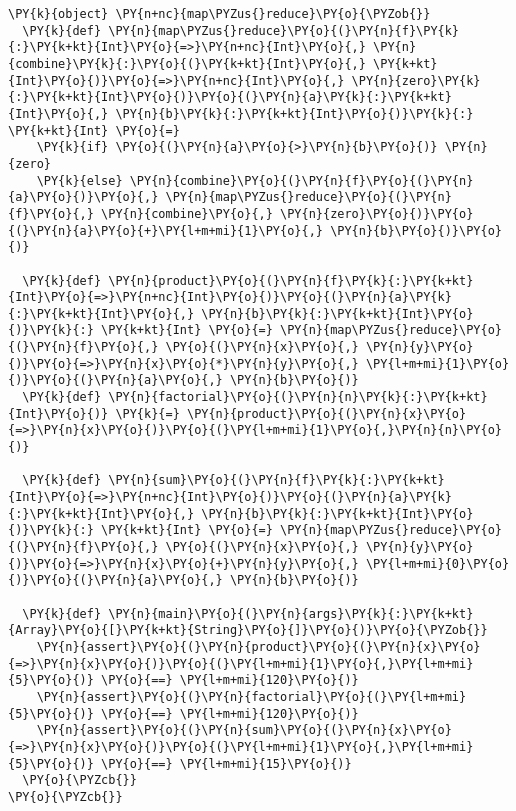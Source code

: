\begin{Verbatim}[commandchars=\\\{\}]
\PY{k}{object} \PY{n+nc}{map\PYZus{}reduce}\PY{o}{\PYZob{}}
  \PY{k}{def} \PY{n}{map\PYZus{}reduce}\PY{o}{(}\PY{n}{f}\PY{k}{:}\PY{k+kt}{Int}\PY{o}{=>}\PY{n+nc}{Int}\PY{o}{,} \PY{n}{combine}\PY{k}{:}\PY{o}{(}\PY{k+kt}{Int}\PY{o}{,} \PY{k+kt}{Int}\PY{o}{)}\PY{o}{=>}\PY{n+nc}{Int}\PY{o}{,} \PY{n}{zero}\PY{k}{:}\PY{k+kt}{Int}\PY{o}{)}\PY{o}{(}\PY{n}{a}\PY{k}{:}\PY{k+kt}{Int}\PY{o}{,} \PY{n}{b}\PY{k}{:}\PY{k+kt}{Int}\PY{o}{)}\PY{k}{:} \PY{k+kt}{Int} \PY{o}{=}
    \PY{k}{if} \PY{o}{(}\PY{n}{a}\PY{o}{>}\PY{n}{b}\PY{o}{)} \PY{n}{zero}
    \PY{k}{else} \PY{n}{combine}\PY{o}{(}\PY{n}{f}\PY{o}{(}\PY{n}{a}\PY{o}{)}\PY{o}{,} \PY{n}{map\PYZus{}reduce}\PY{o}{(}\PY{n}{f}\PY{o}{,} \PY{n}{combine}\PY{o}{,} \PY{n}{zero}\PY{o}{)}\PY{o}{(}\PY{n}{a}\PY{o}{+}\PY{l+m+mi}{1}\PY{o}{,} \PY{n}{b}\PY{o}{)}\PY{o}{)}

  \PY{k}{def} \PY{n}{product}\PY{o}{(}\PY{n}{f}\PY{k}{:}\PY{k+kt}{Int}\PY{o}{=>}\PY{n+nc}{Int}\PY{o}{)}\PY{o}{(}\PY{n}{a}\PY{k}{:}\PY{k+kt}{Int}\PY{o}{,} \PY{n}{b}\PY{k}{:}\PY{k+kt}{Int}\PY{o}{)}\PY{k}{:} \PY{k+kt}{Int} \PY{o}{=} \PY{n}{map\PYZus{}reduce}\PY{o}{(}\PY{n}{f}\PY{o}{,} \PY{o}{(}\PY{n}{x}\PY{o}{,} \PY{n}{y}\PY{o}{)}\PY{o}{=>}\PY{n}{x}\PY{o}{*}\PY{n}{y}\PY{o}{,} \PY{l+m+mi}{1}\PY{o}{)}\PY{o}{(}\PY{n}{a}\PY{o}{,} \PY{n}{b}\PY{o}{)}
  \PY{k}{def} \PY{n}{factorial}\PY{o}{(}\PY{n}{n}\PY{k}{:}\PY{k+kt}{Int}\PY{o}{)} \PY{k}{=} \PY{n}{product}\PY{o}{(}\PY{n}{x}\PY{o}{=>}\PY{n}{x}\PY{o}{)}\PY{o}{(}\PY{l+m+mi}{1}\PY{o}{,}\PY{n}{n}\PY{o}{)}

  \PY{k}{def} \PY{n}{sum}\PY{o}{(}\PY{n}{f}\PY{k}{:}\PY{k+kt}{Int}\PY{o}{=>}\PY{n+nc}{Int}\PY{o}{)}\PY{o}{(}\PY{n}{a}\PY{k}{:}\PY{k+kt}{Int}\PY{o}{,} \PY{n}{b}\PY{k}{:}\PY{k+kt}{Int}\PY{o}{)}\PY{k}{:} \PY{k+kt}{Int} \PY{o}{=} \PY{n}{map\PYZus{}reduce}\PY{o}{(}\PY{n}{f}\PY{o}{,} \PY{o}{(}\PY{n}{x}\PY{o}{,} \PY{n}{y}\PY{o}{)}\PY{o}{=>}\PY{n}{x}\PY{o}{+}\PY{n}{y}\PY{o}{,} \PY{l+m+mi}{0}\PY{o}{)}\PY{o}{(}\PY{n}{a}\PY{o}{,} \PY{n}{b}\PY{o}{)}

  \PY{k}{def} \PY{n}{main}\PY{o}{(}\PY{n}{args}\PY{k}{:}\PY{k+kt}{Array}\PY{o}{[}\PY{k+kt}{String}\PY{o}{]}\PY{o}{)}\PY{o}{\PYZob{}}
    \PY{n}{assert}\PY{o}{(}\PY{n}{product}\PY{o}{(}\PY{n}{x}\PY{o}{=>}\PY{n}{x}\PY{o}{)}\PY{o}{(}\PY{l+m+mi}{1}\PY{o}{,}\PY{l+m+mi}{5}\PY{o}{)} \PY{o}{==} \PY{l+m+mi}{120}\PY{o}{)}
    \PY{n}{assert}\PY{o}{(}\PY{n}{factorial}\PY{o}{(}\PY{l+m+mi}{5}\PY{o}{)} \PY{o}{==} \PY{l+m+mi}{120}\PY{o}{)}
    \PY{n}{assert}\PY{o}{(}\PY{n}{sum}\PY{o}{(}\PY{n}{x}\PY{o}{=>}\PY{n}{x}\PY{o}{)}\PY{o}{(}\PY{l+m+mi}{1}\PY{o}{,}\PY{l+m+mi}{5}\PY{o}{)} \PY{o}{==} \PY{l+m+mi}{15}\PY{o}{)}
  \PY{o}{\PYZcb{}}
\PY{o}{\PYZcb{}}
\end{Verbatim}
